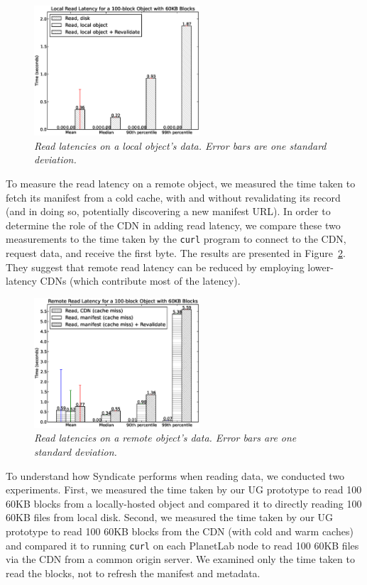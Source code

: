 \begin{figure}[h!]
\centerline{\includegraphics[width=0.55\textwidth]{figures/read_latency_local}}
\label{fig:read_latency_local}
\caption{\it Read latencies on a local object's data.  Error bars are one standard deviation.}
\end{figure}

To measure the read latency on a remote object, we measured the time taken to fetch its manifest from a cold cache, with and without revalidating its record (and in doing so, potentially discovering a new manifest URL).  In order to determine the role of the CDN in adding read latency, we compare these two measurements to the time taken by the \texttt{curl} program to connect to the CDN, request data, and receive the first byte.  The results are presented in Figure~\ref{fig:read_latency_remote}.  They suggest that remote read latency can be reduced by employing lower-latency CDNs (which contribute most of the latency).

\begin{figure}[h!]
\centerline{\includegraphics[width=0.55\textwidth]{figures/read_latency_remote}}
\label{fig:read_latency_remote}
\caption{\it Read latencies on a remote object's data.  Error bars are one standard deviation.}
\end{figure}

To understand how Syndicate performs when reading data, we conducted two experiments.  First, we measured the time taken by our UG prototype to read 100 60KB blocks from a locally-hosted object and compared it to directly reading 100 60KB files from local disk.  Second, we measured the time taken by our UG prototype to read 100 60KB blocks from the CDN (with cold and warm caches) and compared it to running \texttt{curl} on each PlanetLab node to read 100 60KB files via the CDN from a common origin server.  We examined only the time taken to read the blocks, not to refresh the manifest and metadata.


